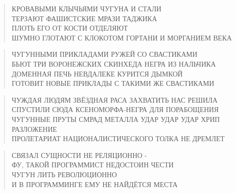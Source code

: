 \poemtitle{***}
\begin{verse}
КРОВАВЫМИ КЛЫЧЬЯМИ ЧУГУНА И СТАЛИ\\
ТЕРЗАЮТ ФАШИСТСКИЕ МРАЗИ ТАДЖИКА\\
ПЛОТЬ ЕГО ОТ КОСТИ ОТДЕЛЯЮТ\\
ШУМНО ГЛОТАЮТ С КЛОКОТОМ ГОРТАНИ И МОРГАНИЕМ ВЕКА
\end{verse}

\poemtitle{***}
\begin{verse}
ЧУГУННЫМИ ПРИКЛАДАМИ РУЖЕЙ СО СВАСТИКАМИ\\
БЬЮТ ТРИ ВОРОНЕЖСКИХ СКИНХЕДА НЕГРА ИЗ НАЛЬЧИКА\\
ДОМЕННАЯ ПЕЧЬ НЕВДАЛЕКЕ КУРИТСЯ ДЫМКОЙ\\
ГОТОВИТ НОВЫЕ ПРИКЛАДЫ С ТАКИМИ ЖЕ СВАСТИКАМИ
\end{verse}

\poemtitle{***}
\begin{verse}
ЧУЖДАЯ ЛЮДЯМ ЗВЁЗДНАЯ РАСА ЗАХВАТИТЬ НАС РЕШИЛА\\
СПУСТИЛИ СЮДА КСЕНОМОРФА-НЕГРА ДЛЯ ПОРАБОЩЕНИЯ\\
ЧУГУННЫЕ ПРУТЫ СМРАД МЕТАЛЛА УДАР УДАР УДАР ХРИП РАЗЛОЖЕНИЕ\\
ПРОЛЕТАРИАТ НАЦИОНАЛИСТИЧЕСКОГО ТОЛКА НЕ ДРЕМЛЕТ
\end{verse}

\poemtitle{***}
\begin{verse}
СВЯЗАЛ СУЩНОСТИ НЕ РЕЛЯЦИОННО - \\
ФУ, ТАКОЙ ПРОГРАММИСТ НЕДОСТОИН ЧЕСТИ\\
ЧУГУН ЛИТЬ РЕВОЛЮЦИОННО \\
И В ПРОГРАММИНГЕ ЕМУ НЕ НАЙДЁТСЯ МЕСТА
\end{verse}

